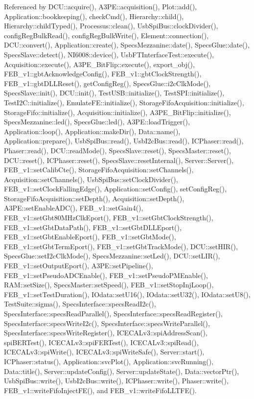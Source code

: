 Referenced by DCU::acquire(), A3PE::acquisition(), Plot::add(), Application::bookkeeping(), checkCmd(), Hierarchy::child(), Hierarchy::childTyped(), Processus::clean(), UsbSpiBus::clockDivider(), configRegBulkRead(), configRegBulkWrite(), Element::connection(), DCU::convert(), Application::create(), SpecsMezzanine::date(), SpecsGlue::date(), SpecsSlave::detect(), NI6008::device(), UsbFTInterfaceTest::execute(), Acquisition::execute(), A3PE\_\-BitFlip::execute(), export\_\-obj(), FEB\_\-v1::gbtAcknowledgeConfig(), FEB\_\-v1::gbtClockStrength(), FEB\_\-v1::gbtDLLReset(), getConfigReg(), SpecsGlue::i2cClkMode(), SpecsSlave::init(), DCU::init(), TestUSB::initialize(), TestSPI::initialize(), TestI2C::initialize(), EmulateFE::initialize(), StorageFifoAcquisition::initialize(), StorageFifo::initialize(), Acquisition::initialize(), A3PE\_\-BitFlip::initialize(), SpecsMezzanine::led(), SpecsGlue::led(), A3PE::loadTrigger(), Application::loop(), Application::makeDir(), Data::name(), Application::prepare(), UsbSpiBus::read(), UsbI2cBus::read(), ICPhaser::read(), Phaser::read(), DCU::readMode(), SpecsSlave::reset(), SpecsMaster::reset(), DCU::reset(), ICPhaser::reset(), SpecsSlave::resetInternal(), Server::Server(), FEB\_\-v1::setCalibCte(), StorageFifoAcquisition::setChannels(), Acquisition::setChannels(), UsbSpiBus::setClockDivider(), FEB\_\-v1::setClockFallingEdge(), Application::setConfig(), setConfigReg(), StorageFifoAcquisition::setDepth(), Acquisition::setDepth(), A3PE::setEnableADC(), FEB\_\-v1::setGain4(), FEB\_\-v1::setGbt80MHzClkEport(), FEB\_\-v1::setGbtClockStrength(), FEB\_\-v1::setGbtDataPath(), FEB\_\-v1::setGbtDLLEport(), FEB\_\-v1::setGbtEnableEport(), FEB\_\-v1::setGbtMode(), FEB\_\-v1::setGbtTermEport(), FEB\_\-v1::setGbtTrackMode(), DCU::setHIR(), SpecsGlue::setI2cClkMode(), SpecsMezzanine::setLed(), DCU::setLIR(), FEB\_\-v1::setOutputEport(), A3PE::setPipeline(), FEB\_\-v1::setPseudoADCEnable(), FEB\_\-v1::setPseudoPMEnable(), RAM::setSize(), SpecsMaster::setSpeed(), FEB\_\-v1::setStopInjLoop(), FEB\_\-v1::setTestDuration(), IOdata::setU16(), IOdata::setU32(), IOdata::setU8(), TestSuite::sigma(), SpecsInterface::specsReadI2c(), SpecsInterface::specsReadParallel(), SpecsInterface::specsReadRegister(), SpecsInterface::specsWriteI2c(), SpecsInterface::specsWriteParallel(), SpecsInterface::specsWriteRegister(), ICECALv3::spiAddressScan(), spiBERTest(), ICECALv3::spiFERTest(), ICECALv3::spiRead(), ICECALv3::spiWrite(), ICECALv3::spiWriteSafe(), Server::start(), ICPhaser::status(), Application::svcPlot(), Application::svcRunning(), Data::title(), Server::updateConfig(), Server::updateState(), Data::vectorPtr(), UsbSpiBus::write(), UsbI2cBus::write(), ICPhaser::write(), Phaser::write(), FEB\_\-v1::writeFifoInjectFE(), and FEB\_\-v1::writeFifoLLTFE().


